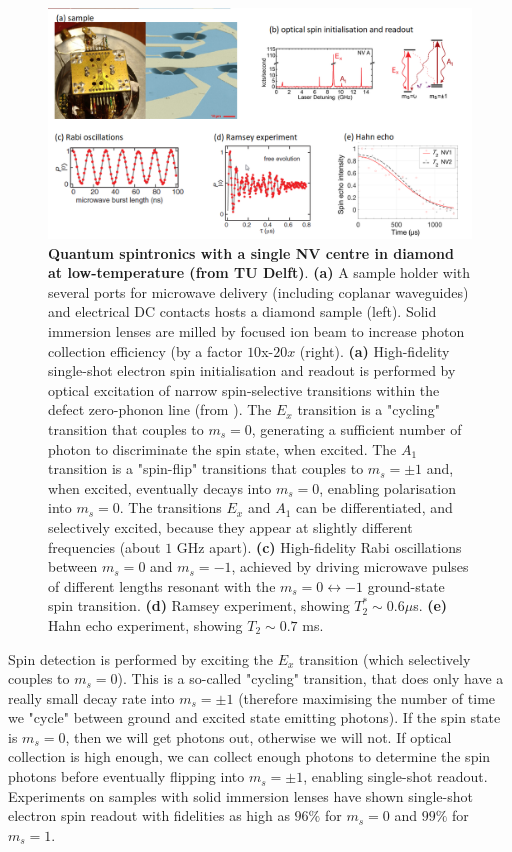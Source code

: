 \documentclass[a4paper,11pt]{article}
\begin{document}
\begin{figure}[h]
\centering
\includegraphics[width = 1\textwidth]{figures/NV_centre_LT.png}
\caption{{\bf Quantum spintronics with a single NV centre in diamond at low-temperature (from TU Delft)}. {\bf (a)} A sample holder with several ports for microwave delivery (including coplanar waveguides) and electrical DC contacts hosts a diamond sample (left). Solid immersion lenses are milled by focused ion beam to increase photon collection efficiency (by a factor $10$x-$20x$ (right). {\bf (a)} High-fidelity single-shot electron spin initialisation and readout is performed by optical excitation of narrow spin-selective transitions within the defect zero-phonon line (from \cite{robledo_high-fidelity_2011}). The $E_x$ transition is a "cycling" transition that couples to $m_s=0$, generating a sufficient number of photon to discriminate the spin state, when excited. The $A_1$ transition is a "spin-flip" transitions that couples to $m_s = \pm 1$ and, when excited, eventually decays into $m_s = 0$, enabling polarisation into $m_s = 0$. The transitions $E_x$ and $A_1$ can be differentiated, and selectively excited, because they appear at slightly different frequencies (about $1$ GHz apart). {\bf (c)} High-fidelity Rabi oscillations between $m_s = 0$ and $m_s = -1$, achieved by driving microwave pulses of different lengths resonant with the $m_s = 0 \leftrightarrow -1$ ground-state spin transition. {\bf (d)} Ramsey experiment, showing $T_2^* \sim 0.6 \mu$s. {\bf (e)} Hahn echo experiment, showing $T_2 \sim 0.7$ ms.}
\label{fig:NV_LT}
\end{figure}

Spin detection is performed by exciting the $E_x$ transition (which selectively couples to $m_s = 0$). This is a so-called "cycling" transition, that does only have a really small decay rate into $m_s = \pm 1$ (therefore maximising the number of time we "cycle" between ground and excited state emitting photons). If the spin state is $m_s = 0$, then we will get photons out, otherwise we will not. If optical collection is high enough, we can collect enough photons to determine the spin photons before eventually flipping into $m_s = \pm 1$, enabling single-shot readout. Experiments on samples with solid immersion lenses have shown single-shot electron spin readout with fidelities as high as $96\%$ for $m_s = 0$ and $99\%$ for $m_s = 1$.
\end{document}

